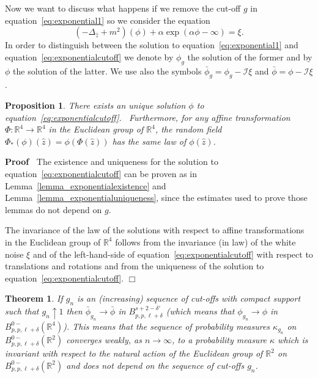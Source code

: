 \documentclass[a4paper,10pt]{article}
\newcommand{\asterisk}{\mathord{*}}
\newenvironment{proof}{\noindent\textbf{Proof\ }}{\hspace*{\fill}$\Box$\medskip}
\newtheorem{proposition}{Proposition}
{\theorembodyfont{\rmfamily}\newtheorem{remark}{Remark}}
\newtheorem{theorem}{Theorem}
\begin{document}
Now we want to discuss what happens if we remove the cut-off $g$ in
equation~{\eqref{eq:exponential1}} so we consider the equation
\begin{equation}
  (- \Delta_{\hat{z}} + m^2) (\phi) + \alpha \exp (\alpha \phi - \infty) = \xi
  . \label{eq:exponentialcutoff}
\end{equation}
In order to distinguish between the solution to
equation~{\eqref{eq:exponential1}} and equation~{\eqref{eq:exponentialcutoff}}
we denote by $\phi_g$ the solution of the former and by $\phi$ the solution of
the latter. We use also the symbols $\bar{\phi}_g = \phi_g - \mathcal{I} \xi$
and $\bar{\phi} = \phi - \mathcal{I} \xi$.

\begin{proposition}
  \label{proposition_g1}There exists an unique solution $\phi$ to
  equation~{\eqref{eq:exponentialcutoff}}. \ Furthermore, for any affine
  transformation $\Phi : \mathbb{R}^4 \rightarrow \mathbb{R}^4$ in the
  Euclidean group of $\mathbb{R}^4$, the random field $\Phi_{\asterisk} (\phi)
  (\hat{z}) = \phi (\Phi (\hat{z}))$ has the same law of $\phi (\hat{z})$.
\end{proposition}

\begin{proof}
  The existence and uniqueness for the solution to
  equation~{\eqref{eq:exponentialcutoff}} can be proven as in
  Lemma~\ref{lemma_exponentialexistence} and
  Lemma~\ref{lemma_exponentialuniqueness}, since the estimates used to prove
  those lemmas do not depend on $g$.
  
  The invariance of the law of the solutions with respect to affine
  transformations in the Euclidean group of $\mathbb{R}^4$ follows from the
  invariance (in law) of the white noise $\xi$ and of the left-hand-side of
  equation~{\eqref{eq:exponentialcutoff}} with respect to translations and
  rotations and from the uniqueness of the solution to
  equation~{\eqref{eq:exponentialcutoff}}.
\end{proof}

\begin{theorem}
  \label{theorem_dimensionalreduction2}If $g_n$ is an (increasing) sequence of
  cut-offs with compact support such that $g_n \uparrow 1$ then
  $\bar{\phi}_{g_n} \rightarrow \bar{\phi}$ in $B^{s + 2 - \delta'}_{p, p,
  \ell + \delta}$ (which means that $\phi_{g_n} \rightarrow \phi$ in $B^{0
  -}_{p, p, \ell + \delta} (\mathbb{R}^4)$). This means that the sequence of
  probability measures $\kappa_{g_n}$ on $B^{0 -}_{p, p, \ell + \delta}
  (\mathbb{R}^2)$ converges weakly, as $n \rightarrow \infty$, to a
  probability measure $\kappa$ which is invariant with respect to the natural
  action of the Euclidean group of $\mathbb{R}^2$ on $B^{0 -}_{p, p, \ell +
  \delta} (\mathbb{R}^2)$ and does not depend on the sequence of cut-offs
  $g_n$.
\end{theorem}
\end{document}

